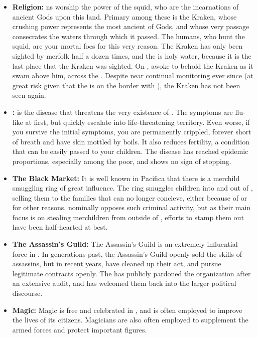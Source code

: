 \documentclass[blue]{NeptuneBall}
\begin{document}
\begin{itemize}
  \item {\bf Religion:} \pPacifica{}ns worship the power of the squid, who are the incarnations of ancient Gods upon this land. Primary among these is the Kraken, whose crushing power represents the most ancient of Gods, and whose very passage consecrates the waters through which it passed. The humans, who hunt the squid, are your mortal foes for this very reason. The Kraken has only been sighted by merfolk half a dozen times, and the \pGazaStrip{} is holy water, because it is the last place that the Kraken was sighted. On \cKraken{\MYname}, \cLiar{\MYname} awoke to behold the Kraken as it swam above him, across the \pGazaStrip{}. Despite near continual monitoring ever since (at great risk given that the \pGazaStrip{} is on the border with \pAtlantis{}), the Kraken has not been seen again.
  \item {\bf \cPolio{}:} \cPolio{} is the disease that threatens the very existence of \pPacifica{}. The symptoms are flu-like at first, but quickly escalate into life-threatening territory. Even worse, if you survive the initial symptoms, you are permanently crippled, forever short of breath and have skin mottled by boils. It also reduces fertility, a condition that can be easily passed to your children. The disease has reached epidemic proportions, especially among the poor, and shows no sign of stopping. 
  \item {\bf The Black Market:} It is well known in Pacifica that there is a merchild smuggling ring of great influence. The ring smuggles children into and out of \pPacifica{}, selling them to the families that can no longer concieve, either because of \cPolio{} or for other reasons. \cPacificanRuler{\King} \cPacificanRuler{} nominally opposes such criminal activity, but as their main focus is on stealing merchildren from outside of \pPacifica{}, efforts to stamp them out have been half-hearted at best.
  \item {\bf The Assassin's Guild:} The Assassin's Guild is an extremely influential force in \pPacifica{}. In generations past, the Assassin's Guild openly sold the skills of assassins, but in recent years, have cleaned up their act, and pursue legitimate contracts openly. The \cPacificanRuler{\King} has publicly pardoned the organization after an extensive audit, and has welcomed them back into the larger political discourse.
  \item {\bf Magic:} Magic is free and celebrated in \pPacifica{}, and is often employed to improve the lives of its citizens. Magicians are also often employed to supplement the armed forces and protect important figures.
  

\end{itemize}
\end{document}
